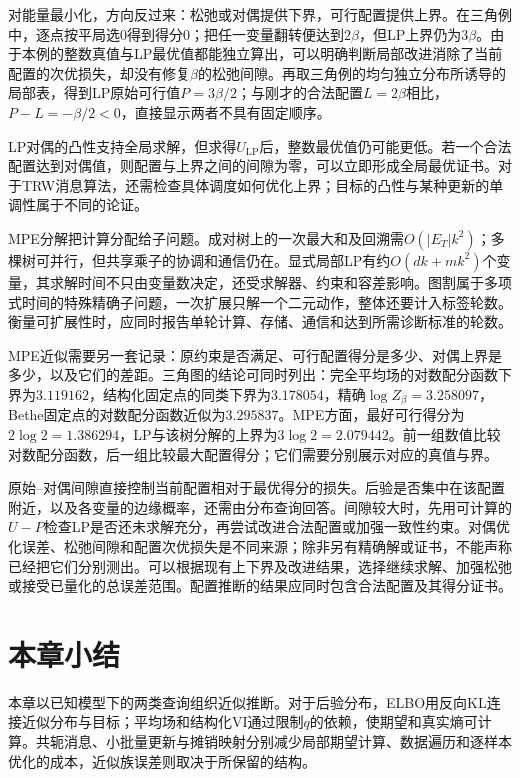 对能量最小化，方向反过来：松弛或对偶提供下界，可行配置提供上界。在三角例中，逐点按平局选$0$得到得分$0$；把任一变量翻转便达到$2\beta$，但LP上界仍为$3\beta$。由于本例的整数真值与LP最优值都能独立算出，可以明确判断局部改进消除了当前配置的次优损失，却没有修复$\beta$的松弛间隙。再取三角例的均匀独立分布所诱导的局部表，得到LP原始可行值$P=3\beta/2$；与刚才的合法配置$L=2\beta$相比，$P-L=-\beta/2<0$，直接显示两者不具有固定顺序。

LP对偶的凸性支持全局求解，但求得$U_{\mathrm{LP}}$后，整数最优值仍可能更低。若一个合法配置达到对偶值，则配置与上界之间的间隙为零，可以立即形成全局最优证书。对于TRW消息算法，还需检查具体调度如何优化上界；目标的凸性与某种更新的单调性属于不同的论证。

MPE分解把计算分配给子问题。成对树上的一次最大和及回溯需$O(|E_T|k^2)$；多棵树可并行，但共享乘子的协调和通信仍在。显式局部LP有约$O(dk+mk^2)$个变量，其求解时间不只由变量数决定，还受求解器、约束和容差影响。图割属于多项式时间的特殊精确子问题，一次扩展只解一个二元动作，整体还要计入标签轮数。衡量可扩展性时，应同时报告单轮计算、存储、通信和达到所需诊断标准的轮数。

MPE近似需要另一套记录：原约束是否满足、可行配置得分是多少、对偶上界是多少，以及它们的差距。三角图的结论可同时列出：完全平均场的对数配分函数下界为$3.119162$，结构化固定点的同类下界为$3.178054$，精确$\log Z_\beta=3.258097$，Bethe固定点的对数配分函数近似为$3.295837$。MPE方面，最好可行得分为$2\log2=1.386294$，LP与该树分解的上界为$3\log2=2.079442$。前一组数值比较对数配分函数，后一组比较最大配置得分；它们需要分别展示对应的真值与界。

原始--对偶间隙直接控制当前配置相对于最优得分的损失。后验是否集中在该配置附近，以及各变量的边缘概率，还需由分布查询回答。间隙较大时，先用可计算的$U-P$检查LP是否还未求解充分，再尝试改进合法配置或加强一致性约束。对偶优化误差、松弛间隙和配置次优损失是不同来源；除非另有精确解或证书，不能声称已经把它们分别测出。可以根据现有上下界及改进结果，选择继续求解、加强松弛或接受已量化的总误差范围。配置推断的结果应同时包含合法配置及其得分证书。

\section{本章小结}

\label{sec:pgm-variational-summary}

本章以已知模型下的两类查询组织近似推断。对于后验分布，ELBO用反向KL连接近似分布与目标；平均场和结构化VI通过限制$q$的依赖，使期望和真实熵可计算。共轭消息、小批量更新与摊销映射分别减少局部期望计算、数据遍历和逐样本优化的成本，近似族误差则取决于所保留的结构。

